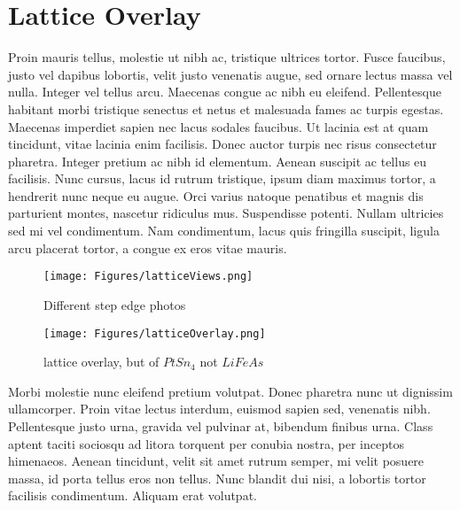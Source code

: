 \section{Lattice Overlay}

Proin mauris tellus, molestie ut nibh ac, tristique ultrices tortor. Fusce faucibus, justo vel dapibus lobortis, velit justo venenatis augue, sed ornare lectus massa vel nulla. Integer vel tellus arcu. Maecenas congue ac nibh eu eleifend. Pellentesque habitant morbi tristique senectus et netus et malesuada fames ac turpis egestas. Maecenas imperdiet sapien nec lacus sodales faucibus. Ut lacinia est at quam tincidunt, vitae lacinia enim facilisis. Donec auctor turpis nec risus consectetur pharetra. Integer pretium ac nibh id elementum. Aenean suscipit ac tellus eu facilisis. Nunc cursus, lacus id rutrum tristique, ipsum diam maximus tortor, a hendrerit nunc neque eu augue. Orci varius natoque penatibus et magnis dis parturient montes, nascetur ridiculus mus. Suspendisse potenti. Nullam ultricies sed mi vel condimentum. Nam condimentum, lacus quis fringilla suscipit, ligula arcu placerat tortor, a congue ex eros vitae mauris.

    \begin{figure}
        \centering
        \texttt{[image: Figures/latticeViews.png]}
        \caption{Different step edge photos}
        \label{fig:stm}
    \end{figure}

    \begin{figure}
        \centering
        \texttt{[image: Figures/latticeOverlay.png]}
        \caption{lattice overlay, but of $PtSn_4$ not $LiFeAs$}
        \label{fig:stm}
    \end{figure}
    
Morbi molestie nunc eleifend pretium volutpat. Donec pharetra nunc ut dignissim ullamcorper. Proin vitae lectus interdum, euismod sapien sed, venenatis nibh. Pellentesque justo urna, gravida vel pulvinar at, bibendum finibus urna. Class aptent taciti sociosqu ad litora torquent per conubia nostra, per inceptos himenaeos. Aenean tincidunt, velit sit amet rutrum semper, mi velit posuere massa, id porta tellus eros non tellus. Nunc blandit dui nisi, a lobortis tortor facilisis condimentum. Aliquam erat volutpat.

